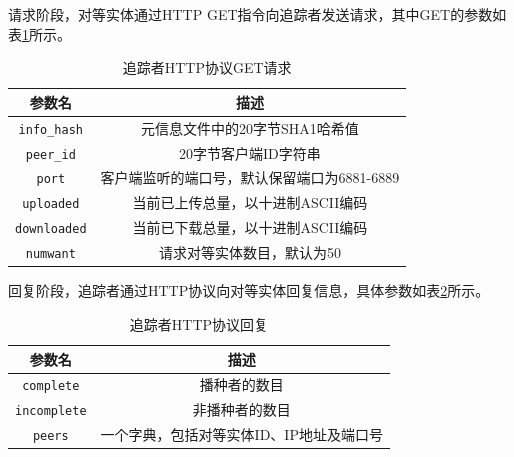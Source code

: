 \documentclass[thesis]{thesis}
\begin{document}
请求阶段，对等实体通过HTTP GET指令向追踪者发送请求，其中GET的参数如表\ref{tab:request}所示。
\begin{table}[htbp]
\caption{追踪者HTTP协议GET请求}
\label{tab:request}
\centering
\begin{tabular}{|c|c|}\hline
\textbf{参数名} & \textbf{描述}\\\hline
\verb'info_hash' & 元信息文件中的20字节SHA1哈希值\\\hline
\verb'peer_id' & 20字节客户端ID字符串\\\hline
\verb'port' & 客户端监听的端口号，默认保留端口为6881-6889\\\hline
\verb'uploaded' & 当前已上传总量，以十进制ASCII编码\\\hline
\verb'downloaded' & 当前已下载总量，以十进制ASCII编码\\\hline
\verb'numwant' & 请求对等实体数目，默认为50\\\hline
\end{tabular}
\end{table}

回复阶段，追踪者通过HTTP协议向对等实体回复信息，具体参数如表\ref{tab:respond}所示。
\begin{table}[htbp]
\caption{追踪者HTTP协议回复}
\label{tab:respond}
\centering
\begin{tabular}{|c|c|}\hline
\textbf{参数名} & \textbf{描述}\\\hline
\verb'complete' & 播种者的数目\\\hline
\verb'incomplete' & 非播种者的数目\\\hline
\verb'peers' & 一个字典，包括对等实体ID、IP地址及端口号\\\hline
\end{tabular}
\end{table}
\end{document}
